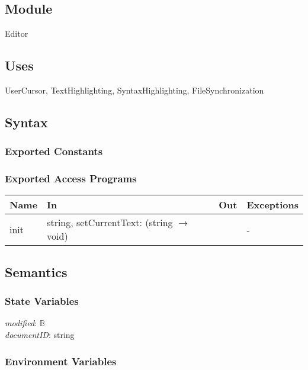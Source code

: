 \documentclass[12pt, titlepage]{article}
\begin{document}
	\subsection{Module}
	
	Editor
	
	\subsection{Uses}
	UserCursor, TextHighlighting, SyntaxHighlighting, FileSynchronization
	
	\subsection{Syntax}
	
	\subsubsection{Exported Constants}
	
	\subsubsection{Exported Access Programs}
	
	\begin{center}
		\begin{tabular}{p{2cm} p{8cm} p{1cm} p{2cm}}
			\hline
			\textbf{Name} & \textbf{In} & \textbf{Out} & \textbf{Exceptions} \\
			\hline
			init & string, setCurrentText: (string $\rightarrow$ void) &  & - \\
			\hline
		\end{tabular}
	\end{center}
	
	\subsection{Semantics}
	
	\subsubsection{State Variables}
	\textit{modified}: $\mathbb{B}$\\
	\textit{documentID}: string\\
	
	\subsubsection{Environment Variables}
	
\end{document}
